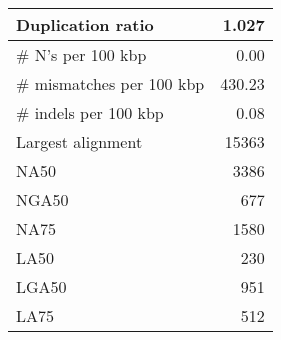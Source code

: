\documentclass[12pt,a4paper]{article}
\begin{document}
\begin{table}[ht]
\begin{center}
\begin{tabular}{|l*{1}{|r}|}
Duplication ratio & 1.027 \\ \hline
\# N's per 100 kbp & 0.00 \\ \hline
\# mismatches per 100 kbp & 430.23 \\ \hline
\# indels per 100 kbp & 0.08 \\ \hline
Largest alignment & 15363 \\ \hline
NA50 & 3386 \\ \hline
NGA50 & 677 \\ \hline
NA75 & 1580 \\ \hline
LA50 & 230 \\ \hline
LGA50 & 951 \\ \hline
LA75 & 512 \\ \hline
\end{tabular}
\end{center}
\end{table}
\end{document}
